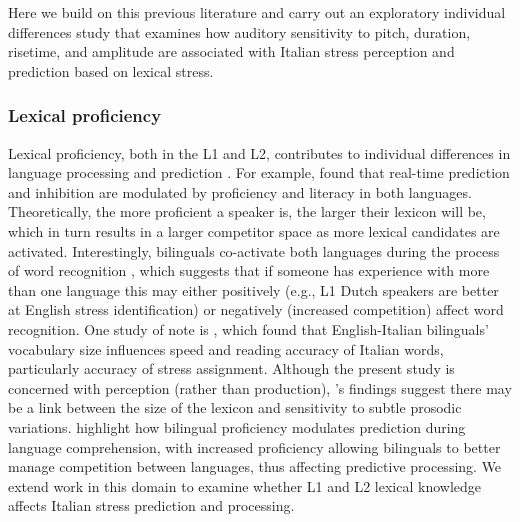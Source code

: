 Here we build on this previous literature and carry out an exploratory individual differences study that examines how auditory sensitivity to pitch, duration, risetime, and amplitude are associated with Italian stress perception and prediction based on lexical stress.

\subsubsection{Lexical proficiency}
Lexical proficiency, both in the L1 and L2, contributes to individual differences in language processing and prediction \citep{Diependaele2013, Yap2012}. For example, \cite{Kukona2016} found that real-time prediction and inhibition are modulated by proficiency and literacy in both languages. Theoretically, the more proficient a speaker is, the larger their lexicon will be, which in turn results in a larger competitor space as more lexical candidates are activated. Interestingly, bilinguals co-activate both languages during the process of word recognition \citep{kroll1997lexical, dijkstra2002architecture, marian2003competing}, which suggests that if someone has experience with more than one language this may either positively (e.g., L1 Dutch speakers are better at English stress identification) or negatively (increased competition) affect word recognition. One study of note is \cite{primativo2013bilingual}, which found that English-Italian bilinguals' vocabulary size influences speed and reading accuracy of Italian words, particularly accuracy of stress assignment. Although the present study is concerned with perception (rather than production), \cite{primativo2013bilingual}'s findings suggest there may be a link between the size of the lexicon and sensitivity to subtle prosodic variations. \cite{misra2012} highlight how bilingual proficiency modulates prediction during language comprehension, with increased proficiency allowing bilinguals to better manage competition between languages, thus affecting predictive processing. We extend work in this domain to examine whether L1 and L2 lexical knowledge affects Italian stress prediction and processing.

